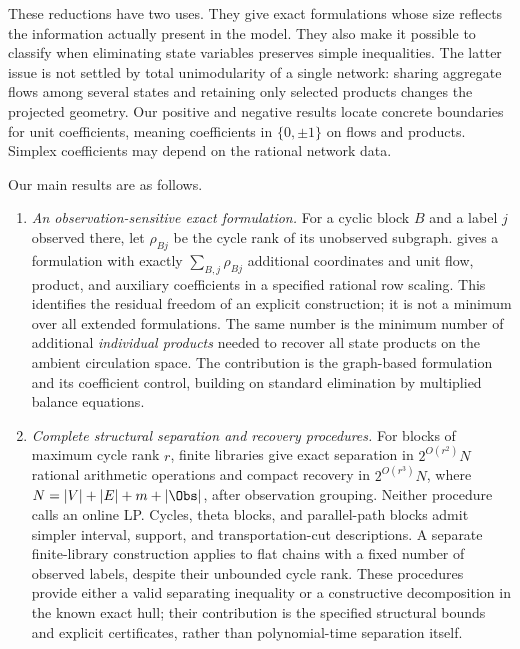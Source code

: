 These reductions have two uses. They give exact formulations whose size
reflects the information actually present in the model. They also make it
possible to classify when eliminating state variables preserves simple
inequalities. The latter issue is not settled by total unimodularity of a
single network: sharing aggregate flows among several states and retaining
only selected products changes the projected geometry. Our positive and
negative results locate concrete boundaries for unit coefficients, meaning
coefficients in $\{0,\pm1\}$ on flows and products. Simplex coefficients may
depend on the rational network data.

Our main results are as follows.
\begin{enumerate}[leftmargin=*,itemsep=5pt]
\item \emph{An observation-sensitive exact formulation.}
For a cyclic block $B$ and a label $j$ observed there, let $\rho_{Bj}$
be the cycle rank of its unobserved subgraph.
 gives a formulation with exactly
$\sum_{B,j}\rho_{Bj}$ additional coordinates and unit flow, product,
and auxiliary coefficients in a specified rational row scaling.
This identifies the residual freedom of an explicit construction; it is
not a minimum over all extended formulations. The same number is the
minimum number of additional \emph{individual products} needed to recover
all state products on the ambient circulation space. The contribution is
the graph-based formulation and its coefficient control, building on
standard elimination by multiplied balance equations.

\item \emph{Complete structural separation and recovery procedures.}
For blocks of maximum cycle rank $r$, finite libraries give exact
separation in $2^{O(r^2)}N$ rational arithmetic operations and compact
recovery in $2^{O(r^3)}N$, where
$N=|V|+|E|+m+|\Obs|$, after observation grouping. Neither procedure
calls an online LP. Cycles, theta blocks, and parallel-path blocks admit
simpler interval, support, and transportation-cut descriptions.
A separate finite-library construction applies to flat chains with a fixed
number of observed labels, despite their unbounded cycle rank.
These procedures provide either a valid separating inequality or a
constructive decomposition in the known exact hull; their contribution is
the specified structural bounds and explicit certificates, rather than
polynomial-time separation itself.


\end{enumerate}
